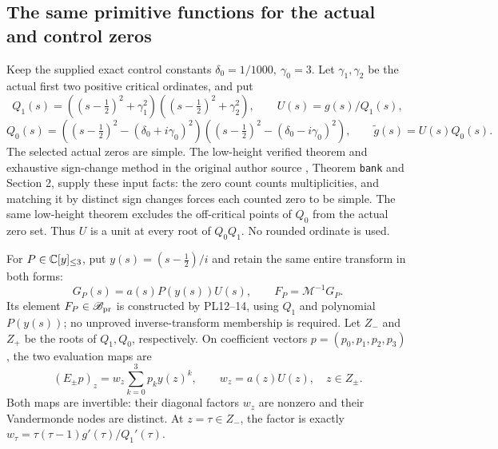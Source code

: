 \subsection{The same primitive functions for the actual and control zeros}
Keep the supplied exact control constants
\(\delta_0=1/1000,\ \gamma_0=3\). Let \(\gamma_1,\gamma_2\)
be the actual first two positive critical ordinates, and put
\[
 Q_1(s)=((s-\tfrac12)^2+\gamma_1^2)
        ((s-\tfrac12)^2+\gamma_2^2),\qquad U(s)=g(s)/Q_1(s),
\]
\[
 Q_0(s)=((s-\tfrac12)^2-(\delta_0+i\gamma_0)^2)
        ((s-\tfrac12)^2-(\delta_0-i\gamma_0)^2),\qquad
 \widetilde g(s)=U(s)Q_0(s).
 \tag{PL29}\label{pl:pl:control}
\]
The selected actual zeros are simple. The low-height verified theorem
and exhaustive sign-change method in the original author source
\cite{PlattTrudgian}, Theorem \texttt{bank} and Section 2, supply these input facts:
the zero count counts multiplicities, and matching it by distinct
sign changes forces each counted zero to be simple. The same
low-height theorem excludes the off-critical points of \(Q_0\)
from the actual zero set. Thus \(U\) is a unit at every root of
\(Q_0Q_1\). No rounded ordinate is used.

For \(P\in\mathbb C[y]_{\le3}\), put \(y(s)=(s-\tfrac12)/i\) and retain
the same entire transform in both forms:
\[
 G_P(s)=a(s)P(y(s))U(s),\qquad F_P=\mathcal M^{-1}G_P.
 \tag{PL30}\label{pl:pl:same-tests}
\]
Its element \(F_P\in\mathscr B_{\rm pr}\) is constructed by PL12--14,
using \(Q_1\) and polynomial \(P(y(s))\); no unproved inverse-transform
membership is required.
Let \(Z_-\) and \(Z_+\) be the roots of \(Q_1,Q_0\), respectively.
On coefficient vectors \(p=(p_0,p_1,p_2,p_3)\), the two evaluation maps are
\[
 (E_\pm p)_z=w_z\sum_{k=0}^3p_k y(z)^k,\qquad
 w_z=a(z)U(z),\quad z\in Z_\pm.
 \tag{PL31}\label{pl:pl:Emaps}
\]
Both maps are invertible: their diagonal factors \(w_z\) are nonzero
and their Vandermonde nodes are distinct.
At \(z=\tau\in Z_-\), the factor is exactly
\(w_\tau=\tau(\tau-1)g'(\tau)/Q_1'(\tau)\).

